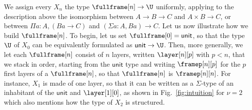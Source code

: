 \documentclass[10pt]{art.cls/art}
\newcommand{\unittype}{\ensuremath{\mathsf{unit}}}
\begin{document}
We assign every $X_n$ the type $\fullframe[n] \rightarrow \U$ uniformly, applying to the description above the isomorphism between $A \rightarrow B \rightarrow C$ and $A \times B \rightarrow C$, or between $\Pi a : A, (B a \rightarrow C)$ and $(\Sigma a : A, B a) \rightarrow C$. Let us now illustrate how we build $\fullframe[n]$. To begin, let us set $\fullframe[0] = \unittype$, so that the type $\U$ of $X_0$ can be equivalently formulated as $\unittype \rightarrow \U$. Then, more generally, we let each $\fullframe[n]$ consist of $n$ layers, written $\layer[n][p]$ with $p < n$, that we stack in order, starting from the $\unittype$ type and writing $\framep[n][p]$ for the $p$ first layers of a $\fullframe[n]$, so that $\fullframe[n]$ is $\framep[n][n]$. For instance, $X_1$ is made of one layer, so that it can be written as a $\Sigma$-type of an inhabitant of the $\unittype$ and $\layer[1][0]$, as shown in Fig.~\ref{fig:intuition} for $\nu = 2$ which also mentions how the type of $X_2$ is structured.
\end{document}
